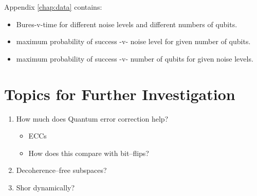 \pagebreak

\noindent
Appendix \ref{chap:data} contains:
\begin{itemize}
\item Bures-v-time for different noise levels and different numbers of qubits.
\item maximum probability of success -v- noise level for given number of qubits.
\item maximum probability of success -v- number of qubits for given noise levels.
\end{itemize}



%


%

\section{Topics for Further Investigation}

\begin{enumerate}
\item How much does Quantum error correction help?
\begin{itemize}
\item ECCs
\item How does this compare with bit--flips?
\end{itemize}
\item Decoherence--free subspaces?
\item Shor dynamically?
\end{enumerate}
